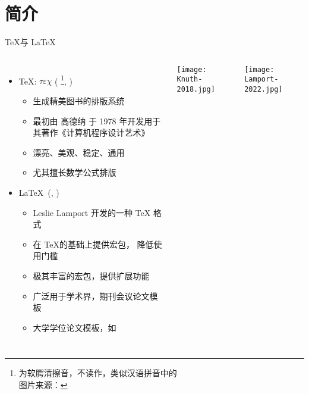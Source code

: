 
\section{简介}

\begin{frame}{\TeX 与 \LaTeX}
  \begin{columns}[T]
    \begin{itemize}
      \item \TeX: $\tau\varepsilon\chi$ (
        \footnote{为软腭清擦音，不读作，类似汉语拼音中的\\
        图片来源：
        },
      )
        \begin{itemize}
          \item 生成精美图书的排版系统
          \item 最初由 高德纳  于 1978 年开发用于其著作《计算机程序设计艺术》
          \item 漂亮、美观、稳定、通用
          \item 尤其擅长数学公式排版
        \end{itemize}
      \item \LaTeX\ (, )
        \begin{itemize}
          \item Leslie Lamport 开发的一种 \TeX{} 格式
          \item 在 \TeX 的基础上提供宏包， 降低使用门槛
          \item 极其丰富的宏包，提供扩展功能
          \item 广泛用于学术界，期刊会议论文模板
          \item 大学学位论文模板，如 
        \end{itemize}
    \end{itemize}
    \vspace*{0.05\paperheight}
    \texttt{[image: Knuth-2018.jpg]}

    \vspace*{0.18\paperheight}
    \texttt{[image: Lamport-2022.jpg]}

  \end{columns}
\end{frame}

